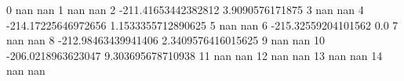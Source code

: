 0 nan nan
1 nan nan
2 -211.41653442382812 3.9090576171875
3 nan nan
4 -214.17225646972656 1.1533355712890625
5 nan nan
6 -215.32559204101562 0.0
7 nan nan
8 -212.98463439941406 2.3409576416015625
9 nan nan
10 -206.0218963623047 9.303695678710938
11 nan nan
12 nan nan
13 nan nan
14 nan nan
